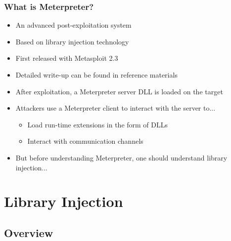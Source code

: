 \documentclass{beamer}
\newenvironment{sitemize}{\vspace{1mm}\begin{itemize}\itemsep 4pt\small}{\end{itemize}}
\begin{document}
\begin{frame}[t]
    \frametitle{What is Meterpreter?}

    \begin{sitemize}
        \item An advanced post-exploitation system
        \item Based on library injection technology
        \item First released with Metasploit 2.3
        \item Detailed write-up can be found in reference materials
    \end{sitemize}

    \begin{sitemize}
        \pause
        \item After exploitation, a Meterpreter server DLL is
        loaded on the target

        \pause
        \item Attackers use a Meterpreter client to interact with
        the server to...
        \begin{sitemize}
            \item Load run-time extensions in the form of DLLs
            \item Interact with communication channels
        \end{sitemize}
    \end{sitemize}
    \begin{sitemize}
        \pause
        \item But before understanding Meterpreter, one should understand
        library injection...

    \end{sitemize}
\end{frame}



%
%
\section{Library Injection}

\subsection{Overview}
\end{document}
